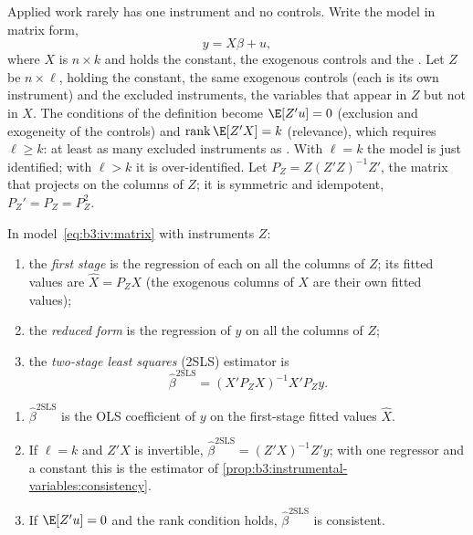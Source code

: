 Applied work rarely has one instrument and no controls. Write the model in
matrix form,
\begin{equation}\label{eq:b3:iv:matrix}
  y = X\beta + u,
\end{equation}
where $X$ is $n \times k$ and holds the constant, the exogenous controls and
the . Let $Z$ be $n \times \ell$, holding the constant,
the same exogenous controls (each is its own instrument) and the excluded
instruments, the variables that appear in $Z$ but not in $X$. The conditions
of the definition become $\E[Z'u] = 0$ (exclusion and exogeneity of the
controls) and $\operatorname{rank} \E[Z'X] = k$ (relevance), which requires
$\ell \geq k$: at least as many excluded instruments as . With $\ell = k$ the model is just identified; with $\ell > k$ it
is over-identified. Let $P_Z = Z(Z'Z)^{-1}Z'$, the matrix that projects on the
columns of $Z$; it is symmetric and idempotent, $P_Z' = P_Z = P_Z^2$.

\begin{definition}\label{def:b3:instrumental-variables:tsls}
In model~\eqref{eq:b3:iv:matrix} with instruments $Z$:
\begin{enumerate}
\item the \emph{first stage} is the regression of each  on
all the columns of $Z$; its fitted values are $\hat X = P_Z X$ (the exogenous
columns of $X$ are their own fitted values);
\item the \emph{reduced form} is the regression of $y$ on all the columns of
$Z$;
\item the \emph{two-stage least squares} (2SLS) estimator is
\[
  \hat\beta^{\mathrm{2SLS}} = (X' P_Z X)^{-1} X' P_Z y .
\]
\end{enumerate}
\end{definition}

\begin{proposition}\label{prop:b3:instrumental-variables:tsls}
\begin{enumerate}
\item $\hat\beta^{\mathrm{2SLS}}$ is the OLS coefficient of $y$ on the
first-stage fitted values $\hat X$.
\item If $\ell = k$ and $Z'X$ is invertible, $\hat\beta^{\mathrm{2SLS}} =
(Z'X)^{-1} Z'y$; with one regressor and a constant this is the estimator of
\cref{prop:b3:instrumental-variables:consistency}.
\item If $\E[Z'u] = 0$ and the rank condition holds, $\hat\beta^{\mathrm{2SLS}}$
is consistent.
\end{enumerate}
\end{proposition}

